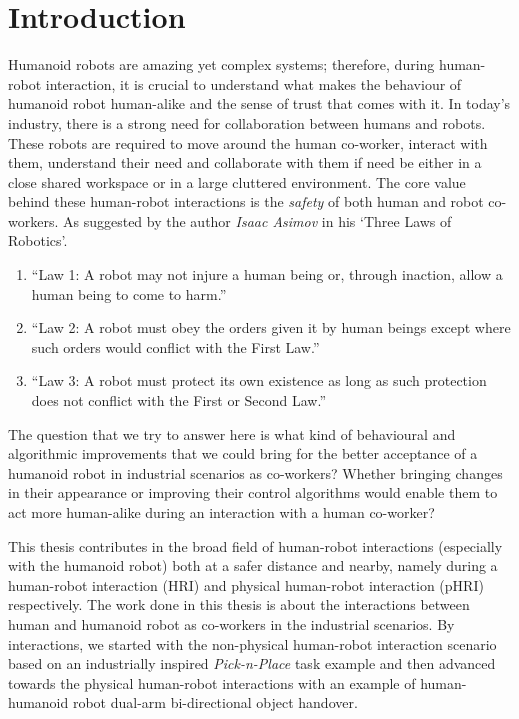 
{\color{blue}\chapter*{Introduction}}
\pagestyle{plain}

Humanoid robots are amazing yet complex systems; therefore, during human-robot interaction, it is crucial to understand what makes the behaviour of humanoid robot human-alike and the sense of trust that comes with it. In today's industry, there is a strong need for collaboration between humans and robots. These robots are required to move around the human co-worker, interact with them, understand their need and collaborate with them if need be either in a close shared workspace or in a large cluttered environment. The core value behind these human-robot interactions is the \textit{safety} of both human and robot co-workers. As suggested by the author \textit{Isaac Asimov} in his `Three Laws of Robotics'.


\begin{enumerate}
	\item ``Law  1: A  robot  may  not  injure  a  human  being  or, through  inaction,  allow  a human being to come to harm.''
	\item ``Law 2:  A robot must obey the orders given it by human beings except where such orders would conflict with the First Law.''
	\item ``Law 3:  A robot must protect its own existence as long as such protection does not conflict with the First or Second Law.''
\end{enumerate}

The question that we try to answer here is what kind of behavioural and algorithmic improvements that we could bring for the better acceptance of a humanoid robot in industrial scenarios as co-workers? Whether bringing changes in their appearance or improving their control algorithms would enable them to act more human-alike during an interaction with a human co-worker?


This thesis contributes in the broad field of human-robot interactions (especially with the humanoid robot) both at a safer distance and nearby, namely during a human-robot interaction (HRI) and physical human-robot interaction (pHRI) respectively. The work done in this thesis is about the interactions between human and humanoid robot as co-workers in the industrial scenarios. By interactions, we started with the non-physical human-robot interaction scenario based on an industrially inspired \textit{Pick-n-Place} task example and then advanced towards the physical human-robot interactions with an example of human-humanoid robot dual-arm bi-directional object handover. 


